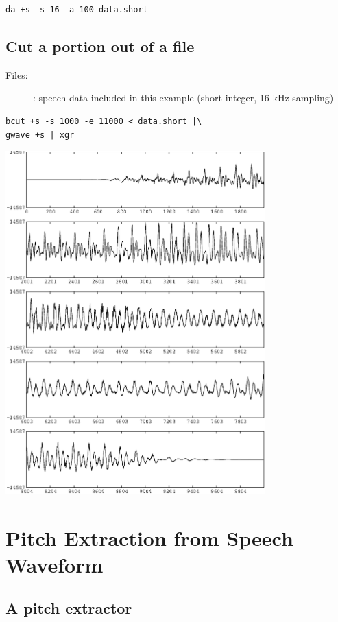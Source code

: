 \documentclass[a4paper,10pt]{article}
\begin{document}
\begin{verbatim}
da +s -s 16 -a 100 data.short
\end{verbatim}

\subsection{Cut a portion out of a file}

\begin{description}
\item[Files:]
  : speech data included in this example (short integer, 16 kHz sampling)
\end{description}

\begin{verbatim}
bcut +s -s 1000 -e 11000 < data.short |\
gwave +s | xgr
\end{verbatim}

\includegraphics[width=10cm]{eps/data.bcut.gwave.eps}

\section{Pitch Extraction from Speech Waveform}

\subsection{A pitch extractor}
\end{document}
